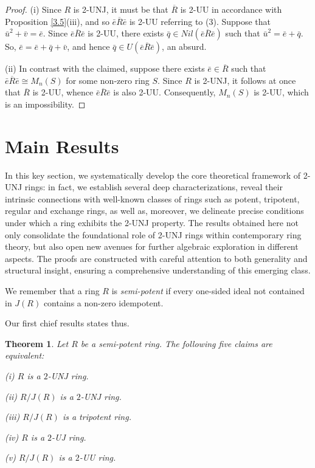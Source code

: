 \documentclass[12pt]{amsart}
\newtheorem{theorem}{Theorem}[section]
\theoremstyle{definition}
\begin{document}
\begin{proof}
(i) Since \( R \) is 2-UNJ, it must be that \( \overline{R} \) is 2-UU in accordance with Proposition \ref{3.5}(iii), and so \( \bar{e}\overline{R}\bar{e} \) is 2-UU referring to \cite[Proposition 2.1]{10}(3). Suppose that \( \bar{u}^2 + \bar{v} = \bar{e} \). Since \( \bar{e}\overline{R}\bar{e} \) is 2-UU, there exists \( \bar{q} \in Nil(\bar{e}\overline{R}\bar{e}) \) such that \( \bar{u}^2 = \bar{e} + \bar{q} \). So, \( \bar{e} = \bar{e} + \bar{q} + \bar{v} \), and hence \( \bar{q} \in U(\bar{e}\overline{R}\bar{e}) \), an absurd.
	
(ii) In contrast with the claimed, suppose there exists \( \bar{e} \in \overline{R} \) such that \(\bar{e}\overline{R}\bar{e} \cong M_n(S)\) for some non-zero ring \( S \). Since \( R \) is 2-UNJ, it follows at once that \( \overline{R} \) is 2-UU, whence \( \bar{e}\overline{R}\bar{e} \) is also 2-UU. Consequently, \( M_n(S) \) is 2-UU, which is an impossibility.
\end{proof}

\section{Main Results}

In this key section, we systematically develop the core theoretical framework of 2-UNJ rings: in fact, we establish several deep characterizations, reveal their intrinsic connections with well-known classes of rings such as potent, tripotent, regular and exchange rings, as well as, moreover, we delineate precise conditions under which a ring exhibits the 2-UNJ property. The results obtained here not only consolidate the foundational role of 2-UNJ rings within contemporary ring theory, but also open new avenues for further algebraic exploration in different aspects. The proofs are constructed with careful attention to both generality and structural insight, ensuring a comprehensive understanding of this emerging class.

We remember that a ring $R$ is {\it semi-potent} if every one-sided ideal not contained in $J(R)$ contains a non-zero idempotent.

\medskip

Our first chief results states thus.

\begin{theorem}\label{semipotent}
Let $R$ be a semi-potent ring. The following five claims are equivalent:
	
(i) $R$ is a $2$-UNJ ring.

(ii) $R/J(R)$ is a $2$-UNJ ring.
	
(iii) $R/J(R)$ is a tripotent ring.
	
(iv) $R$ is a $2$-UJ ring.
	
(v) $R/J(R)$ is a $2$-UU ring.
\end{theorem}
\end{document}
